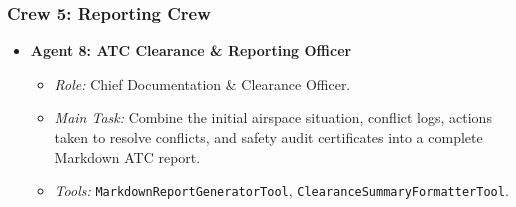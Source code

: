 \documentclass[12pt,a4paper]{article}
\begin{document}
\subsubsection{Crew 5: Reporting Crew}
\begin{itemize}[leftmargin=*]
    \item \textbf{Agent 8: ATC Clearance \& Reporting Officer}
    \begin{itemize}
        \item \textit{Role:} Chief Documentation \& Clearance Officer.
        \item \textit{Main Task:} Combine the initial airspace situation, conflict logs, actions taken to resolve conflicts, and safety audit certificates into a complete Markdown ATC report.
        \item \textit{Tools:} \texttt{MarkdownReportGeneratorTool}, \texttt{ClearanceSummaryFormatterTool}.
    \end{itemize}
\end{itemize}
\end{document}
